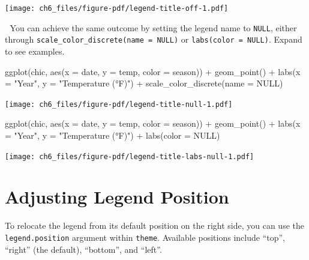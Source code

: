 \documentclass[
  letterpaper,
  DIV=11,
  numbers=noendperiod]{scrreprt}
\newenvironment{Shaded}{\begin{snugshade}}{\end{snugshade}}
\newcommand{\AttributeTok}[1]{\textcolor[rgb]{0.40,0.45,0.13}{#1}}
\newcommand{\ConstantTok}[1]{\textcolor[rgb]{0.56,0.35,0.01}{#1}}
\newcommand{\FunctionTok}[1]{\textcolor[rgb]{0.28,0.35,0.67}{#1}}
\newcommand{\NormalTok}[1]{\textcolor[rgb]{0.00,0.23,0.31}{#1}}
\newcommand{\SpecialCharTok}[1]{\textcolor[rgb]{0.37,0.37,0.37}{#1}}
\newcommand{\StringTok}[1]{\textcolor[rgb]{0.13,0.47,0.30}{#1}}
\begin{document}
\texttt{[image: ch6\_files/figure-pdf/legend-title-off-1.pdf]}

💁 You can achieve the same outcome by setting the legend name to
\texttt{NULL}, either through
\texttt{scale\_color\_discrete(name\ =\ NULL)} or
\texttt{labs(color\ =\ NULL)}. Expand to see examples.

\begin{Shaded}
\begin{Highlighting}[]
\FunctionTok{ggplot}\NormalTok{(chic, }\FunctionTok{aes}\NormalTok{(}\AttributeTok{x =}\NormalTok{ date, }\AttributeTok{y =}\NormalTok{ temp, }\AttributeTok{color =}\NormalTok{ season)) }\SpecialCharTok{+}
  \FunctionTok{geom\_point}\NormalTok{() }\SpecialCharTok{+}
  \FunctionTok{labs}\NormalTok{(}\AttributeTok{x =} \StringTok{"Year"}\NormalTok{, }\AttributeTok{y =} \StringTok{"Temperature (°F)"}\NormalTok{) }\SpecialCharTok{+}
  \FunctionTok{scale\_color\_discrete}\NormalTok{(}\AttributeTok{name =} \ConstantTok{NULL}\NormalTok{)}
\end{Highlighting}
\end{Shaded}

\texttt{[image: ch6\_files/figure-pdf/legend-title-null-1.pdf]}

\begin{Shaded}
\begin{Highlighting}[]
\FunctionTok{ggplot}\NormalTok{(chic, }\FunctionTok{aes}\NormalTok{(}\AttributeTok{x =}\NormalTok{ date, }\AttributeTok{y =}\NormalTok{ temp, }\AttributeTok{color =}\NormalTok{ season)) }\SpecialCharTok{+}
  \FunctionTok{geom\_point}\NormalTok{() }\SpecialCharTok{+}
  \FunctionTok{labs}\NormalTok{(}\AttributeTok{x =} \StringTok{"Year"}\NormalTok{, }\AttributeTok{y =} \StringTok{"Temperature (°F)"}\NormalTok{) }\SpecialCharTok{+}
  \FunctionTok{labs}\NormalTok{(}\AttributeTok{color =} \ConstantTok{NULL}\NormalTok{)}
\end{Highlighting}
\end{Shaded}

\texttt{[image: ch6\_files/figure-pdf/legend-title-labs-null-1.pdf]}

\section{Adjusting Legend Position}\label{adjusting-legend-position}

To relocate the legend from its default position on the right side, you
can use the \texttt{legend.position} argument within \texttt{theme}.
Available positions include ``top'', ``right'' (the default),
``bottom'', and ``left''.
\end{document}
